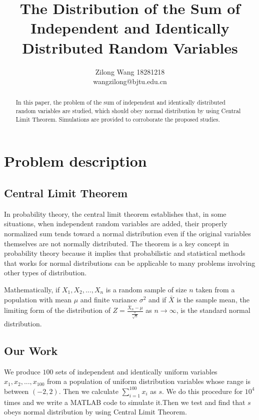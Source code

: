 \documentclass[conference]{IEEEtran}
\begin{document}
\title{The Distribution of the Sum of Independent and Identically Distributed Random Variables}
\author{Zilong Wang 18281218\\wangzilong@bjtu.edu.cn

 }


\maketitle
\begin{abstract}
In this paper, the problem of the sum of independent and identically distributed random variables are studied, which should obey normal distribution by using Central Limit Theorem. Simulations are provided to corroborate the proposed studies.
\end{abstract}

\begin{IEEEkeywords}

\end{IEEEkeywords}



\section{Problem description}
\subsection{Central Limit Theorem\cite{b1}}
In probability theory, the central limit theorem establishes that, in some situations, when independent random variables are added, their properly normalized sum tends toward a normal distribution even if the original variables themselves are not normally distributed. The theorem is a key concept in probability theory because it implies that probabilistic and statistical methods that works for normal distributions can be applicable to many problems involving other types of distribution.

Mathematically, if $X_1, X_2, ..., X_n$ is a random sample of size $n$ taken from a population with mean $\mu$ and finite variance $\sigma^2$ and if $\bar{X}$ is the sample mean, the limiting form of the distribution of $Z=\frac{\bar{X}_n-\mu}{\frac{\sigma}{\sqrt{n}}}$ as $n\to \infty$, is the standard normal distribution.

\subsection{Our Work}
We produce $100$ sets of independent and identically uniform variables $x_1, x_2, ..., x_{100}$ from a population of uniform distribution variables whose range is between $(-2,2)$. Then we calculate $\sum_{i=1}^{100}x_i$ as $s$. We do this procedure for $10^4$ times and we write a MATLAB code to simulate it.Then we test and find that $s$ obeys normal distribution by using Central Limit Theorem. 
\end{document}
